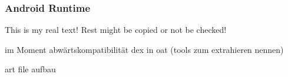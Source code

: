 \subsubsection{Android Runtime} \label{subsubsection:android-evolution-art}
This is my real text! Rest might be copied or not be checked!


im Moment abwärtskompatibilität dex in oat (tools zum extrahieren nennen)


art file aufbau\newline
